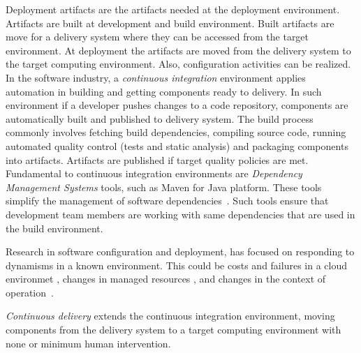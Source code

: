 Deployment artifacts are the artifacts needed at the deployment environment. Artifacts are built at development and build environment. Built artifacts are move for a delivery system where they can be accessed from the target environment. At deployment the artifacts are moved from the delivery system to the target computing environment. Also, configuration activities can be realized.
In the software industry, a \emph{continuous integration}\cite{humble_continuous_2010} environment applies automation in building and getting components ready to delivery. In such environment if a developer pushes changes to a code repository, components are automatically built and published to delivery system. The build process commonly involves fetching build dependencies, compiling source code, running automated quality control (tests and static analysis) and packaging components into artifacts. Artifacts are published if target quality policies are met.
Fundamental to continuous integration environments are \emph{Dependency Management Systems} tools, such as Maven\cite{apache_apache_2016} for Java platform. These tools simplify the management of software dependencies~\cite{spinellis_package_2012}. Such tools ensure that development team members are working with same dependencies that are used in the build environment.

Research in software configuration and deployment, has focused on responding to dynamisms in a known environment. This could be costs and failures in a cloud environmet \cite{ferreira_leite_user_2014}, changes in managed resources \citep{gunalp_rondo_2015}, and changes in the context of operation~\cite{bencomo_dynamically_2008}.

\emph{Continuous delivery}\cite{humble_continuous_2010} extends the continuous integration environment, moving components from the delivery system to a target computing environment with none or minimum human intervention.

